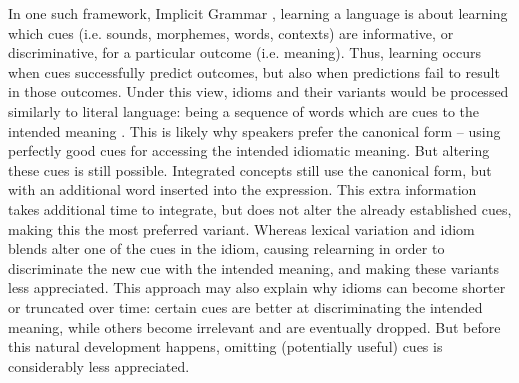\documentclass[output=paper
,modfonts
,nonflat]{langsci/langscibook}
\begin{document}
In one such framework, Implicit Grammar \citep{BaayenRamscar2015}, learning a language is about learning which cues (i.e. sounds, morphemes, words, contexts) are informative, or discriminative, for a particular outcome (i.e. meaning). Thus, learning occurs when cues successfully predict outcomes, but also when predictions fail to result in those outcomes. Under this view, idioms and their variants would be processed similarly to literal language: being a sequence of words which are cues to the intended meaning \citep[cf.][]{GeeraertEtAl2017}. This is likely why speakers prefer the canonical form -- using perfectly good cues for accessing the intended idiomatic meaning. But altering these cues is still possible. Integrated concepts still use the canonical form, but with an additional word inserted into the expression. This extra information takes additional time to integrate, but does not alter the already established cues, making this the most preferred variant. Whereas lexical variation and idiom blends alter one of the cues in the idiom, causing relearning in order to discriminate the new cue with the intended meaning, and making these variants less appreciated. This approach may also explain why idioms can become shorter or truncated over time: certain cues are better at discriminating the intended meaning, while others become irrelevant and are eventually dropped. But before this natural development happens, omitting (potentially useful) cues is considerably less appreciated. 




\end{document}
